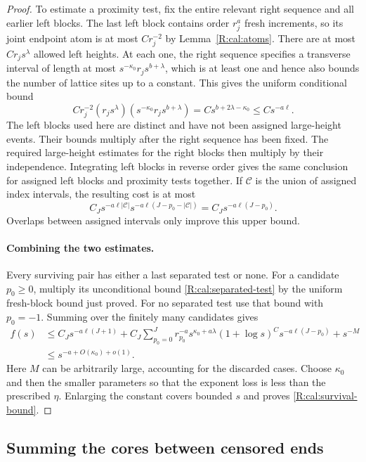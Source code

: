 \begin{proof}
To estimate a proximity test, fix the entire relevant right sequence
and all earlier left blocks. The last left block contains order
$r_j^a$ fresh increments, so its joint endpoint atom is at most
$Cr_j^{-2}$ by Lemma~\ref{R:cal:atoms}. There are at most
$Cr_js^\lambda$ allowed left heights. At each one, the right sequence
specifies a transverse interval of length at most
$s^{-\kappa_0}r_js^{b+\lambda}$, which is at least one and hence also
bounds the number of lattice sites up to a constant. This gives the
uniform conditional bound
\[
 C r_j^{-2}(r_js^\lambda)
                (s^{-\kappa_0}r_js^{b+\lambda})
 = C s^{b+2\lambda-\kappa_0}
 \le C s^{-a\ell}.
\]
The left blocks used here are distinct and have not been assigned
large-height events. Their bounds multiply after the right sequence
has been fixed. The required large-height estimates for the right
blocks then multiply by their independence. Integrating left blocks
in reverse order gives the same conclusion for assigned left blocks
and proximity tests together. If $\mathcal C$ is the union of assigned
index intervals, the resulting cost is at most
\[
 C_J s^{-a\ell|\mathcal C|}
       s^{-a\ell(J-p_0-|\mathcal C|)}
 = C_J s^{-a\ell(J-p_0)}.
\]
Overlaps between assigned intervals only improve this upper bound.

\paragraph{Combining the two estimates.}
Every surviving pair has either a last separated test or none. For a
candidate $p_0\ge0$, multiply its unconditional bound
\eqref{R:cal:separated-test} by the uniform fresh-block bound just
proved. For no separated test use that bound with $p_0=-1$. Summing
over the finitely many candidates gives
\[
\begin{aligned}
 f(s)
 &\le C_J s^{-a\ell(J+1)}
   +C_J\sum_{p_0=0}^J
       r_{p_0}^{-a}s^{\kappa_0+a\lambda}(1+\log s)^C
       s^{-a\ell(J-p_0)}
   +s^{-M}\\
 &\le s^{-a+O(\kappa_0)+o(1)}.
\end{aligned}
\]
Here $M$ can be arbitrarily large, accounting for the discarded cases.
Choose $\kappa_0$ and then the smaller parameters so that the exponent
loss is less than the prescribed $\eta$. Enlarging the constant covers
bounded $s$ and proves \eqref{R:cal:survival-bound}.

\end{proof}

\subsection{Summing the cores between censored ends}\label{R:cal:kernels}

